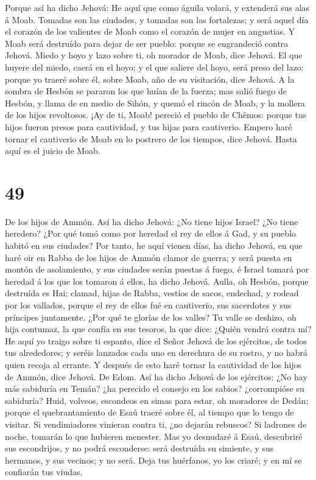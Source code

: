  Porque así ha dicho Jehová: He aquí que como águila
volará, y extenderá sus alas á Moab.  Tomadas son las
ciudades, y tomadas son las fortalezas; y será aquel día el corazón de
los valientes de Moab como el corazón de mujer en angustias.
 Y Moab será destruído para dejar de ser pueblo: porque se
engrandeció contra Jehová.  Miedo y hoyo y lazo sobre ti,
oh morador de Moab, dice Jehová.  El que huyere del miedo,
caerá en el hoyo; y el que saliere del hoyo, será preso del lazo: porque
yo traeré sobre él, sobre Moab, año de su visitación, dice Jehová.
 A la sombra de Hesbón se pararon los que huían de la
fuerza; mas salió fuego de Hesbón, y llama de en medio de Sihón, y quemó
el rincón de Moab, y la mollera de los hijos revoltosos. 
¡Ay de ti, Moab! pereció el pueblo de Chêmos: porque tus hijos fueron
presos para cautividad, y tus hijas para cautiverio. 
Empero haré tornar el cautiverio de Moab en lo postrero de los tiempos,
dice Jehová. Hasta aquí es el juicio de Moab.

\hypertarget{section-48}{%
\section{49}\label{section-48}}

 De los hijos de Ammón. Así ha dicho Jehová: ¿No tiene hijos
Israel? ¿No tiene heredero? ¿Por qué tomó como por heredad el rey de
ellos á Gad, y su pueblo habitó en sus ciudades?  Por tanto,
he aquí vienen días, ha dicho Jehová, en que haré oir en Rabba de los
hijos de Ammón clamor de guerra; y será puesta en montón de asolamiento,
y sus ciudades serán puestas á fuego, é Israel tomará por heredad á los
que los tomaron á ellos, ha dicho Jehová.  Aulla, oh Hesbón,
porque destruída es Hai; clamad, hijas de Rabba, vestíos de sacos,
endechad, y rodead por los vallados, porque el rey de ellos fué en
cautiverio, sus sacerdotes y sus príncipes juntamente.  ¿Por
qué te glorías de los valles? Tu valle se deshizo, oh hija contumaz, la
que confía en sus tesoros, la que dice: ¿Quién vendrá contra mí?
 He aquí yo traigo sobre ti espanto, dice el Señor Jehová de
los ejércitos, de todos tus alrededores; y seréis lanzados cada uno en
derechura de su rostro, y no habrá quien recoja al errante. 
Y después de esto haré tornar la cautividad de los hijos de Ammón, dice
Jehová.  De Edom. Así ha dicho Jehová de los ejércitos: ¿No
hay más sabiduría en Temán? ¿ha perecido el consejo en los sabios?
¿corrompióse su sabiduría?  Huid, volveos, escondeos en
simas para estar, oh moradores de Dedán; porque el quebrantamiento de
Esaú traeré sobre él, al tiempo que lo tengo de visitar.  Si
vendimiadores vinieran contra ti, ¿no dejarán rebuscos? Si ladrones de
noche, tomarán lo que hubieren menester.  Mas yo desnudaré
á Esaú, descubriré sus escondrijos, y no podrá esconderse: será
destruída su simiente, y sus hermanos, y sus vecinos; y no será.
 Deja tus huérfanos, yo los criaré; y en mí se confiarán
tus viudas.

